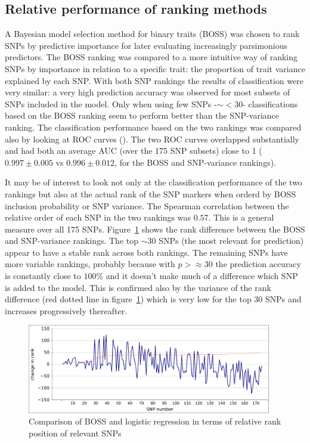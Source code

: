 \subsection{Relative performance of ranking methods}
\label{sec:performance}
A Bayesian model selection method for binary traits (BOSS) was chosen to
rank SNPs by predictive importance for later evaluating increasingly parsimonious
predictors. The BOSS ranking was compared to a more intuitive way of
ranking SNPs by importance in relation to a specific trait: the
proportion of trait variance explained by each SNP.
With both SNP rankings the results of classification were very similar:
a very high prediction accuracy was observed for most subsets of SNPs
included in the model. Only when using few SNPs -$\sim < 30$-
classifications based on the BOSS ranking seem to perform better than
the SNP-variance ranking.
The classification performance based on the two rankings was compared
also by looking at ROC curves (\cite{fawcett2004roc}). The two ROC
curves overlapped substantially and had both an average AUC (over the
175 SNP subsets) close to 1 ($0.997 \pm 0.005$ vs $0.996 \pm 0.012$, for
the BOSS and SNP-variance rankings).

It may be of interest to look not only at the classification performance
of the two rankings but also at the actual rank of the SNP markers when
orderd by BOSS inclusion probability or SNP variance. The Spearman
correlation between the relative order of each SNP in the two rankings
was $0.57$. This is a general measure over all 175 SNPs.
Figure~\ref{fig:rank} shows the rank difference between the BOSS and
SNP-variance rankings. The top $\sim 30$ SNPs (the most relevant for
prediction) appear to have a stable rank across both rankings. The
remaining SNPs have more variable rankings, probably because with
$p > \approx 30$ the prediction accuracy is constantly close to $100\%$
and it doesn't make much of a difference which SNP is added to the
model. This is confirmed also by the variance of the rank difference
(red dotted line in figure~\ref{fig:rank}) which is very low for the top
30 SNPs and increases progressively thereafter.

\begin{figure}
\includegraphics[width=0.95\textwidth]{rank.pdf}
\caption{Comparison of BOSS and logistic regression in terms of relative
rank position of relevant SNPs}
\label{fig:rank} 
\end{figure}



